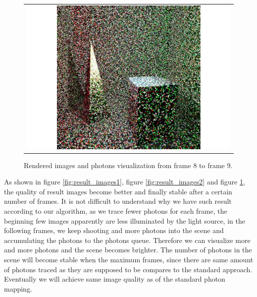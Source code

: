 \begin{figure}
\begin{center}
{\begin{tabular}{c}
\includegraphics*[scale=0.25]{imgs/pqv_frame9.pdf}
\end{tabular}
}%
\renewcommand{\thefigure}{\thechapter.\arabic{figure}} 
\caption[Rendered images and photons visualization from frame 8 to frame 9]{Rendered images and photons visualization from frame 8 to frame 9.}
\label{fig:result_images3}
\end{center}
\end{figure}

As shown in figure \ref{fig:result_images1}, figure \ref{fig:result_images2} and figure \ref{fig:result_images3}, the quality of 	result images become better and finally stable after a certain number of frames. It is not difficult to understand why we have such result according to our algorithm, as we trace fewer photons for each frame, the beginning few images apparently are less illuminated by the light source, in the following frames, we keep shooting and more photons into the scene and accumulating the photons to the photons queue. Therefore we can visualize more and more photons and the scene becomes brighter. The number of photons in the scene will become stable when the maximum frames, since there are same amount of photons traced as they are supposed to be compares to the standard approach. Eventually we will achieve same image quality as of the standard photon mapping. 


